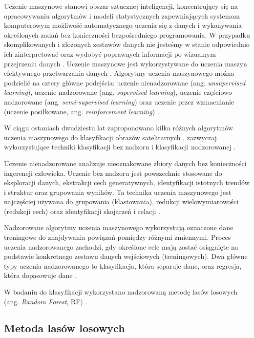 \documentclass{amuthesis}
\begin{document}
Uczenie maszynowe stanowi obszar sztucznej inteligencji, koncentrujący
się na opracowywaniu algorytmów i modeli statystycznych zapewniających
systemom komputerowym możliwość automatycznego uczenia się z danych i
wykonywania określonych zadań bez konieczności bezpośredniego
programowania. W przypadku skomplikowanych i złożonych zestawów danych
nie jesteśmy w stanie odpowiednio ich zinterpretować oraz wydobyć
poprawnych informacji po wizualnym przejrzeniu danych
\autocite{mahesh_2019_ml}. Uczenie maszynowe jest wykorzystywane do
uczenia maszyn efektywnego przetwarzania danych
\autocite{sindayigaya_2022_ml}. Algorytmy uczenia maszynowego można
podzielić na cztery główne podejścia: uczenie nienadzorowane (ang.
\emph{unsupervised learning}), uczenie nadzorowane (ang.
\emph{supervised learning}), uczenie częściowo nadzorowane (ang.
\emph{semi-supervised learning}) oraz uczenie przez wzmacnianie (uczenie
posiłkowane, ang. \emph{reinforcement learning})
\autocite{sarker_2021_ml}.

W ciągu ostaniach dwudziestu lat zaproponowano kilka różnych algorytmów
uczenia maszynowego do klasyfikacji obrazów satelitarnych
\autocite{sheykhmousa_2020_svm_vs_rf}, zazwyczaj wykorzystujące techniki
klasyfikacji bez nadzoru i klasyfikacji nadzorowanej
\autocite{ismail_2009_classification}.

Uczenie nienadzorowane analizuje nieoznakowane zbiory danych bez
konieczności ingerencji człowieka. Uczenie bez nadzoru jest powszechnie
stosowane do eksploracji danych, ekstrakcji cech generatywnych,
identyfikacji istotnych trendów i struktur oraz grupowania wyników. Ta
technika uczenia maszynowego jest najczęściej używana do grupowania
(klastowania), redukcji wielowymiarowości (redukcji cech) oraz
identyfikacji skojarzeń i relacji \autocite{sarker_2021_ml}.

Nadzorowane algorytmy uczenia maszynowego wykorzystują oznaczone dane
treningowe do znajdywania powiązań pomiędzy różnymi zmiennymi. Proces
uczenia nadzorowanego zachodzi, gdy określone cele mają zostać
osiągnięte na podstawie konkretnego zestawu danych wejściowych
(treningowych). Dwa główne typy uczenia nadzorowanego to klasyfikacja,
która separuje dane, oraz regresja, która dopasowuje dane
\autocite{sarker_2021_ml}.

W badaniu do klasyfikacji wykorzystano nadzorowaną metodę lasów losowych
(ang. \emph{Random Forest}, RF) \autocite{breiman_2001_rf}.

\hypertarget{sec-random-forest}{%
\subsection{Metoda lasów losowych}\label{sec-random-forest}}
\end{document}
